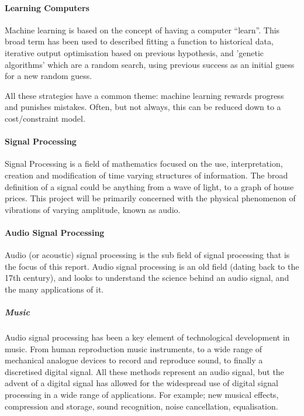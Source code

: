 \documentclass{UoNMCHA}
\newcommand{\inlineQuote}[1]{``#1''}
\numberwithin{equation}{section}
\begin{document}
{\paragraph{Learning Computers}
Machine learning is based on the concept of having a computer \inlineQuote{learn}. This broad term has been used to described fitting a function to historical data, iterative output optimisation based on previous hypothesis, and 'genetic algorithms' which are a random search, using previous success as an initial guess for a new random guess.

All these strategies have a common theme: machine learning rewards progress and punishes mistakes. Often, but not always, this can be reduced down to a cost/constraint model.

\paragraph{Signal Processing}
Signal Processing is a field of mathematics focused on the use, interpretation, creation and modification of time varying structures of information. The broad definition of a signal could be anything from a wave of light, to a graph of house prices. This project will be primarily concerned with the physical phenomenon of vibrations of varying amplitude, known as audio.

\paragraph{Audio Signal Processing}
Audio (or acoustic) signal processing is the sub field of signal processing that is the focus of this report. Audio signal processing is an old field (dating back to the 17th century), and looks to understand the science behind an audio signal, and the many applications of it. 

\subparagraph{Music}
Audio signal processing has been a key element of technological development in music. From human reproduction music instruments, to a wide range of mechanical analogue devices to record and reproduce sound, to finally a discretised digital signal. All these methods represent an audio signal, but the advent of a digital signal has allowed for the widespread use of digital signal processing in a wide range of applications.
For example; new musical effects, compression and storage, sound recognition, noise cancellation, equalisation. %

}
\end{document}

